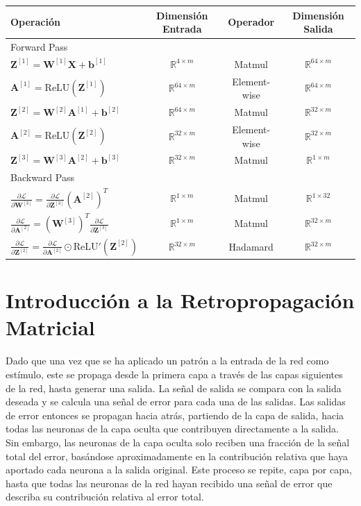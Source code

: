 \documentclass[12pt]{article}
\begin{document}
\begin{table}[h]
\centering
\begin{tabular}{lccc}
\toprule
\textbf{Operación} & \textbf{Dimensión Entrada} & \textbf{Operador} & \textbf{Dimensión Salida} \\
\midrule
Forward Pass & & & \\
$\mathbf{Z}^{[1]} = \mathbf{W}^{[1]}\mathbf{X} + \mathbf{b}^{[1]}$ & $\mathbb{R}^{4 \times m}$ & Matmul & $\mathbb{R}^{64 \times m}$ \\
$\mathbf{A}^{[1]} = \text{ReLU}(\mathbf{Z}^{[1]})$ & $\mathbb{R}^{64 \times m}$ & Element-wise & $\mathbb{R}^{64 \times m}$ \\
$\mathbf{Z}^{[2]} = \mathbf{W}^{[2]}\mathbf{A}^{[1]} + \mathbf{b}^{[2]}$ & $\mathbb{R}^{64 \times m}$ & Matmul & $\mathbb{R}^{32 \times m}$ \\
$\mathbf{A}^{[2]} = \text{ReLU}(\mathbf{Z}^{[2]})$ & $\mathbb{R}^{32 \times m}$ & Element-wise & $\mathbb{R}^{32 \times m}$ \\
$\mathbf{Z}^{[3]} = \mathbf{W}^{[3]}\mathbf{A}^{[2]} + \mathbf{b}^{[3]}$ & $\mathbb{R}^{32 \times m}$ & Matmul & $\mathbb{R}^{1 \times m}$ \\
\midrule
Backward Pass & & & \\
$\frac{\partial \mathcal{L}}{\partial \mathbf{W}^{[3]}} = \frac{\partial \mathcal{L}}{\partial \mathbf{Z}^{[3]}}(\mathbf{A}^{[2]})^T$ & $\mathbb{R}^{1 \times m}$ & Matmul & $\mathbb{R}^{1 \times 32}$ \\
$\frac{\partial \mathcal{L}}{\partial \mathbf{A}^{[2]}} = (\mathbf{W}^{[3]})^T\frac{\partial \mathcal{L}}{\partial \mathbf{Z}^{[3]}}$ & $\mathbb{R}^{1 \times m}$ & Matmul & $\mathbb{R}^{32 \times m}$ \\
$\frac{\partial \mathcal{L}}{\partial \mathbf{Z}^{[2]}} = \frac{\partial \mathcal{L}}{\partial \mathbf{A}^{[2]}} \odot \text{ReLU}'(\mathbf{Z}^{[2]})$ & $\mathbb{R}^{32 \times m}$ & Hadamard & $\mathbb{R}^{32 \times m}$ \\
\bottomrule
\end{tabular}
\end{table}


\section{Introducción a la Retropropagación Matricial}

Dado que una vez que se ha aplicado un patrón a la entrada de la red como estímulo, este se propaga desde la primera capa a través de las capas siguientes de la red, hasta generar una salida. La señal de salida se compara con la salida deseada y se calcula una señal de error para cada una de las salidas. Las salidas de error entonces se propagan hacia atrás, partiendo de la capa de salida, hacia todas las neuronas de la capa oculta que contribuyen directamente a la salida. Sin embargo, las neuronas de la capa oculta solo reciben una fracción de la señal total del error, basándose aproximadamente en la contribución relativa que haya aportado cada neurona a la salida original. Este proceso se repite, capa por capa, hasta que todas las neuronas de la red hayan recibido una señal de error que describa su contribución relativa al error total.
\end{document}
